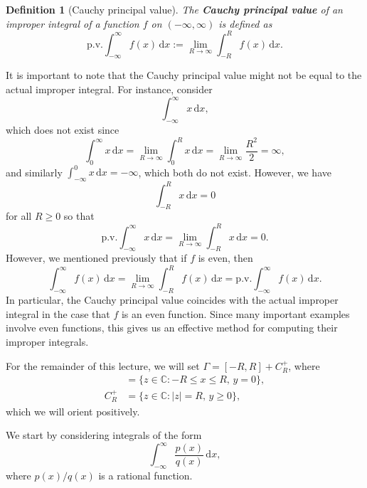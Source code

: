 \documentclass[10pt]{article}
\newcommand{\C}{\mathbb{C}}
\newcommand{\dd}{\,\mathrm{d}}
\newcommand{\pv}{\text{p.v.}}
\theoremstyle{newstyle}
\newtheorem{defn}[thm]{Definition}
\begin{document}
\begin{defn}[Cauchy principal value]
The {\bf Cauchy principal value} of an improper integral of a function $f$
on $(-\infty, \infty)$ is defined as 
\[ \pv\int_{-\infty}^\infty f(x)\dd x := \lim_{R\to\infty} \int_{-R}^R f(x)\dd x. \]
\end{defn}

It is important to note that the Cauchy principal value might not be equal to the actual improper integral.
For instance, consider 
\[ \int_{-\infty}^\infty x\dd x, \] 
which does not exist since 
\[ \int_0^\infty x\dd x = \lim_{R\to\infty} \int_0^R x\dd x = \lim_{R\to\infty} \frac{R^2}2 = \infty, \]
and similarly $\int_{-\infty}^0 x\dd x = -\infty$, which both do not exist. However, we have 
\[ \int_{-R}^R x\dd x = 0 \]
for all $R \geq 0$ so that 
\[ \pv \int_{-\infty}^\infty x\dd x = \lim_{R\to\infty} \int_{-R}^R x\dd x = 0. \]
However, we mentioned previously that if $f$ is even, then 
\[ \int_{-\infty}^\infty f(x)\dd x = \lim_{R\to\infty} \int_{-R}^R f(x)\dd x = \pv\int_{-\infty}^\infty f(x)\dd x. \]
In particular, the Cauchy principal value coincides with the actual improper integral in the case that
$f$ is an even function. Since many important examples involve even functions, this gives us 
an effective method for computing their improper integrals. 

For the remainder of this lecture, we will set $\Gamma = [-R, R] + C_R^+$, where 
\begin{align*}
    [-R, R] &= \{z \in \C : -R \leq x \leq R,\, y = 0\}, \\
    C_R^+ &= \{z \in \C : |z| = R,\, y \geq 0\}, 
\end{align*}
which we will orient positively. 

We start by considering integrals of the form 
\[ \int_{-\infty}^\infty \frac{p(x)}{q(x)}\dd x, \]
where $p(x)/q(x)$ is a rational function. 
\end{document}
